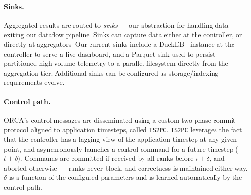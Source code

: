 \documentclass[ letterpaper, DIV=11, numbers=noendperiod]{scrartcl}
\begin{document}

\paragraph{Sinks.} Aggregated results are routed to \emph{sinks} --- our abstraction for handling data exiting our dataflow pipeline. Sinks can capture data either at the controller, or directly at aggregators. Our current sinks include a DuckDB~\cite{Raasv2019:DuckDB} instance at the controller to serve a live dashboard, and a Parquet sink used to persist partitioned high-volume telemetry to a parallel filesystem directly from the aggregation tier. Additional sinks can be configured as storage/indexing requirements evolve.

%
\newcommand{\tstpc}{\texttt{TS2PC}}
\paragraph{Control path.} ORCA’s control messages are disseminated using a
custom two-phase commit protocol aligned to application timesteps, called \tstpc.
\tstpc{} leverages the fact that the controller has a lagging view of the application
timestep at any given point, and asynchronously launches a control command for a future
timestep ($t + \delta$). Commands are committed if received by all ranks before $t + \delta$,
and aborted otherwise --- ranks never block, and correctness is maintained either way. $\delta$ is a function of
the configured parameters and is learned automatically by the control path.
\end{document}
